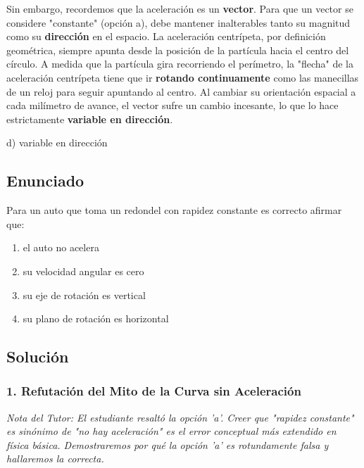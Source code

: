 \documentclass[12pt, a4paper]{article}
\begin{document}
Sin embargo, recordemos que la aceleración es un \textbf{vector}. Para que un vector se considere "constante" (opción a), debe mantener inalterables tanto su magnitud como su \textbf{dirección} en el espacio.
La aceleración centrípeta, por definición geométrica, siempre apunta desde la posición de la partícula hacia el centro del círculo. A medida que la partícula gira recorriendo el perímetro, la "flecha" de la aceleración centrípeta tiene que ir \textbf{rotando continuamente} como las manecillas de un reloj para seguir apuntando al centro.
Al cambiar su orientación espacial a cada milímetro de avance, el vector sufre un cambio incesante, lo que lo hace estrictamente \textbf{variable en dirección}.

\begin{tcolorbox}[colback=green!5!white, colframe=green!50!black, title=Respuesta Final]
\centering \Large d) variable en dirección
\end{tcolorbox}

\newpage

\subsection*{Enunciado}
Para un auto que toma un redondel con rapidez constante es correcto afirmar que:
\begin{enumerate}[label=\alph*)]
    \item el auto no acelera
    \item su velocidad angular es cero
    \item su eje de rotación es vertical
    \item su plano de rotación es horizontal
\end{enumerate}

\subsection*{Solución}

\subsubsection*{1. Refutación del Mito de la Curva sin Aceleración}
\textit{Nota del Tutor: El estudiante resaltó la opción 'a'. Creer que "rapidez constante" es sinónimo de "no hay aceleración" es el error conceptual más extendido en física básica. Demostraremos por qué la opción 'a' es rotundamente falsa y hallaremos la correcta.}
\end{document}
